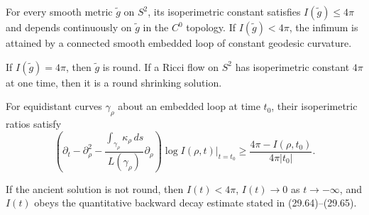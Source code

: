 \begin{lemma}
\label{lem:chow-iv-isoperimetric-minimizers}

For every smooth metric \(\widetilde g\) on \(S^2\), its isoperimetric
constant satisfies \(I(\widetilde g)\le4\pi\) and depends continuously on
\(\widetilde g\) in the \(C^0\) topology.  If \(I(\widetilde g)<4\pi\), the
infimum is attained by a connected smooth embedded loop of constant geodesic
curvature.
\end{lemma}

\begin{lemma}
\label{lem:chow-iv-isoperimetric-rigidity}


If \(I(\widetilde g)=4\pi\), then \(\widetilde g\) is round.  If a Ricci
flow on \(S^2\) has isoperimetric constant \(4\pi\) at one time, then it is a
round shrinking solution.
\end{lemma}

\begin{lemma}
\label{lem:chow-iv-isoperimetric-ratio-evolution}

For equidistant curves \(\gamma_\rho\) about an embedded loop at time \(t_0\),
their isoperimetric ratios satisfy
\[
 \left(\partial_t-\partial_\rho^2-
 \frac{\int_{\gamma_\rho}\kappa_\rho\,ds}{L(\gamma_\rho)}\partial_\rho\right)
 \log I(\rho,t)\big|_{t=t_0}
 \ge \frac{4\pi-I(\rho,t_0)}{4\pi|t_0|}.
\]
\end{lemma}

\begin{proposition}
\label{prop:chow-iv-isoperimetric-decay}


If the ancient solution is not round, then \(I(t)<4\pi\),
\(I(t)\to0\) as \(t\to-\infty\), and \(I(t)\) obeys the quantitative
backward decay estimate stated in (29.64)--(29.65).
\end{proposition}

